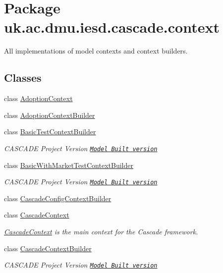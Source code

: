 \hypertarget{namespaceuk_1_1ac_1_1dmu_1_1iesd_1_1cascade_1_1context}{\section{Package uk.\-ac.\-dmu.\-iesd.\-cascade.\-context}
\label{namespaceuk_1_1ac_1_1dmu_1_1iesd_1_1cascade_1_1context}
}


All implementations of model contexts and context builders.  


\subsection*{Classes}
\begin{DoxyCompactItemize}
\item 
class \hyperlink{classuk_1_1ac_1_1dmu_1_1iesd_1_1cascade_1_1context_1_1_adoption_context}{Adoption\-Context}
\item 
class \hyperlink{classuk_1_1ac_1_1dmu_1_1iesd_1_1cascade_1_1context_1_1_adoption_context_builder}{Adoption\-Context\-Builder}
\item 
class \hyperlink{classuk_1_1ac_1_1dmu_1_1iesd_1_1cascade_1_1context_1_1_basic_test_context_builder}{Basic\-Test\-Context\-Builder}
\begin{DoxyCompactList}\small\item\em C\-A\-S\-C\-A\-D\-E Project Version \href{Version# for the entire project/ as whole}{\tt Model Built version} \end{DoxyCompactList}\item 
class \hyperlink{classuk_1_1ac_1_1dmu_1_1iesd_1_1cascade_1_1context_1_1_basic_with_market_test_context_builder}{Basic\-With\-Market\-Test\-Context\-Builder}
\begin{DoxyCompactList}\small\item\em C\-A\-S\-C\-A\-D\-E Project Version \href{Version# for the entire project/ as whole}{\tt Model Built version} \end{DoxyCompactList}\item 
class \hyperlink{classuk_1_1ac_1_1dmu_1_1iesd_1_1cascade_1_1context_1_1_cascade_config_context_builder}{Cascade\-Config\-Context\-Builder}
\item 
class \hyperlink{classuk_1_1ac_1_1dmu_1_1iesd_1_1cascade_1_1context_1_1_cascade_context}{Cascade\-Context}
\begin{DoxyCompactList}\small\item\em {\itshape \hyperlink{classuk_1_1ac_1_1dmu_1_1iesd_1_1cascade_1_1context_1_1_cascade_context}{Cascade\-Context}} is the main context for the {\itshape Cascade} framework. \end{DoxyCompactList}\item 
class \hyperlink{classuk_1_1ac_1_1dmu_1_1iesd_1_1cascade_1_1context_1_1_cascade_context_builder}{Cascade\-Context\-Builder}
\begin{DoxyCompactList}\small\item\em C\-A\-S\-C\-A\-D\-E Project Version \href{Version# for the entire project/ as whole}{\tt Model Built version} \end{DoxyCompactList}\end{DoxyCompactItemize}


